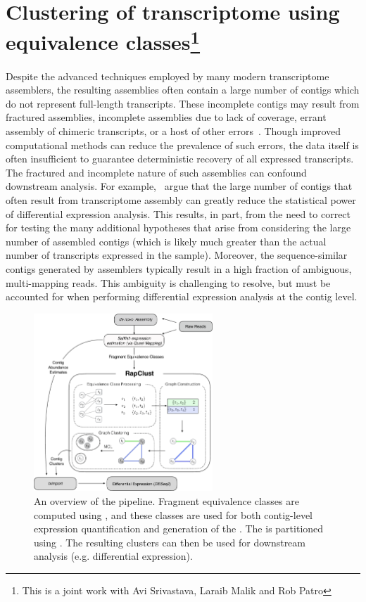 \chapter[\texttt{Quark}]{Clustering of \denovo transcriptome using equivalence classes\footnote{This is a joint work with Avi Srivastava, Laraib Malik and Rob Patro}}

Despite the advanced techniques employed by many modern \denovo transcriptome assemblers, the resulting assemblies often contain a large number of contigs which do not represent full-length transcripts.  These incomplete contigs may result from fractured assemblies, incomplete assemblies due to lack of coverage, errant assembly of chimeric transcripts, or a host of other errors~\cite{transrate}.  Though improved computational methods can reduce the prevalence of such errors, the data itself is often insufficient to guarantee deterministic recovery of all expressed transcripts.  The fractured and incomplete nature of such \denovo assemblies can confound downstream analysis.  For example,~\citet{corset} argue that the large number of contigs that often result from \denovo transcriptome assembly can greatly reduce the statistical power of differential expression analysis.  This results, in part, from the need to correct for testing the many additional hypotheses that arise from considering the large number of assembled contigs (which is likely much greater than the actual number of transcripts expressed in the sample).  Moreover, the sequence-similar contigs generated by \denovo assemblers typically result in a high fraction of ambiguous, multi-mapping reads.  This ambiguity is challenging to resolve, but must be accounted for when performing differential expression analysis at the contig level.

\begin{figure}[!ht]
\includegraphics[width=0.6\textwidth]{Figures/overview}
\centering
\caption{\label{fig:overview}An overview of the \rapclust pipeline. Fragment equivalence classes are computed using \qm, and these classes are used for both contig-level expression quantification and generation of the \ambiggraph. The \ambiggraph is partitioned using \mcl.  The resulting clusters can then be used for downstream analysis (e.g. differential expression).}
\end{figure}

